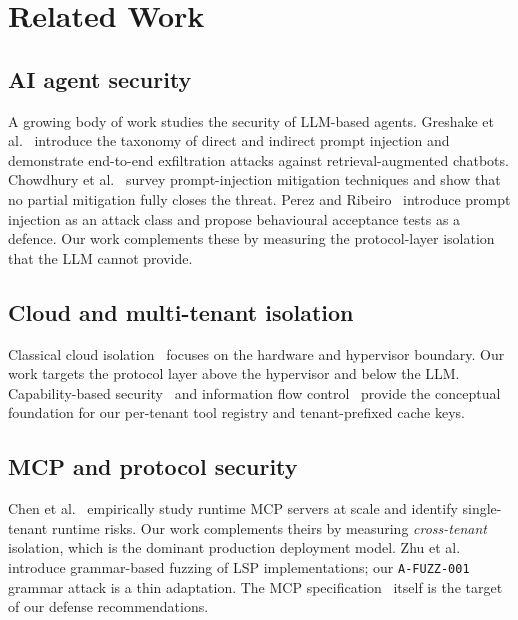 \documentclass[sigconf, anonymous, natbib=false]{acmart}
\begin{document}
\section{Related Work}\label{sec:related}

\subsection{AI agent security}

A growing body of work studies the security of LLM-based
agents. Greshake et al.~\cite{greshake2023youve}
introduce the taxonomy of direct and indirect prompt
injection and demonstrate end-to-end exfiltration attacks
against retrieval-augmented chatbots. Chowdhury et
al.~
\cite{chowdhury2024} survey prompt-injection mitigation
techniques and show that no partial mitigation fully
closes the threat. Perez and Ribeiro~\cite{perez2022ignore}
introduce prompt injection as an attack class and propose
behavioural acceptance tests as a defence. Our work
complements these by measuring the protocol-layer
isolation that the LLM cannot provide.

\subsection{Cloud and multi-tenant isolation}

Classical cloud isolation~\cite{awsnitro,firecracker}
focuses on the hardware and hypervisor boundary. Our
work targets the protocol layer above the hypervisor and
below the LLM. Capability-based security~\cite{miller2003capability}
and information flow control~\cite{sabelfeld2003language}
provide the conceptual foundation for our per-tenant
tool registry and tenant-prefixed cache keys.

\subsection{MCP and protocol security}

Chen et al.~\cite{chen2026runtime} empirically study
runtime MCP servers at scale and identify single-tenant
runtime risks. Our work complements theirs by measuring
\emph{cross-tenant} isolation, which is the dominant
production deployment model. Zhu et
al.~\cite{zhu2025lspfuzz} introduce grammar-based fuzzing
of LSP implementations; our \texttt{A-FUZZ-001} grammar
attack is a thin adaptation. The MCP
specification~\cite{mcp_spec} itself is the target of our
defense recommendations.
\end{document}
